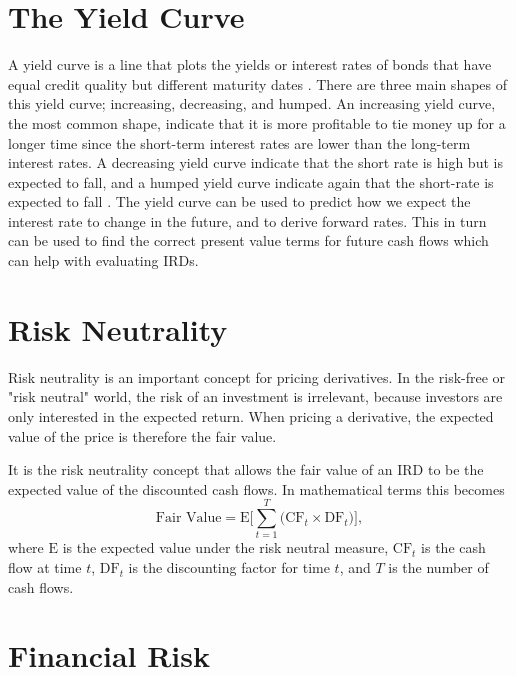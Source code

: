 \section{The Yield Curve} \label{sec:the yield curve}

\noindent A yield curve is a line that plots the yields or interest rates of bonds that have equal credit quality but different maturity dates \cite{investopedia_yield_curve}. There are three main shapes of this yield curve; increasing, decreasing, and humped. An increasing yield curve, the most common shape, indicate that it is more profitable to tie money up for a longer time since the short-term interest rates are lower than the long-term interest rates. A decreasing yield curve indicate that the short rate is high but is expected to fall, and a humped yield curve indicate again that the short-rate is expected to fall \cite[p.~269]{math_financial_derivatives}. The yield curve can be used to predict how we expect the interest rate to change in the future, and to derive forward rates. This in turn can be used to find the correct present value terms for future cash flows which can help with evaluating IRDs.

\section{Risk Neutrality}

\noindent Risk neutrality is an important concept for pricing derivatives. In the risk-free or "risk neutral" world, the risk of an investment is irrelevant, because investors are only interested in the expected return. When pricing a derivative, the expected value of the price is therefore the fair value. \cite[p.~83--84]{math_financial_derivatives}

It is the risk neutrality concept that allows the fair value of an IRD to be the expected \newpage \noindent value of the discounted cash flows. In mathematical terms this becomes \begin{equation*}
    \text{Fair Value} = \text{E} \Biggl[ \sum_{t = 1}^T \bigl( \text{CF}_t \times \text{DF}_t \bigr) \Biggr],
\end{equation*} where $\text{E}$ is the expected value under the risk neutral measure, $\text{CF}_t$ is the cash flow at time $t$, $\text{DF}_t$ is the discounting factor for time $t$, and $T$ is the number of cash flows.


\section{Financial Risk}


